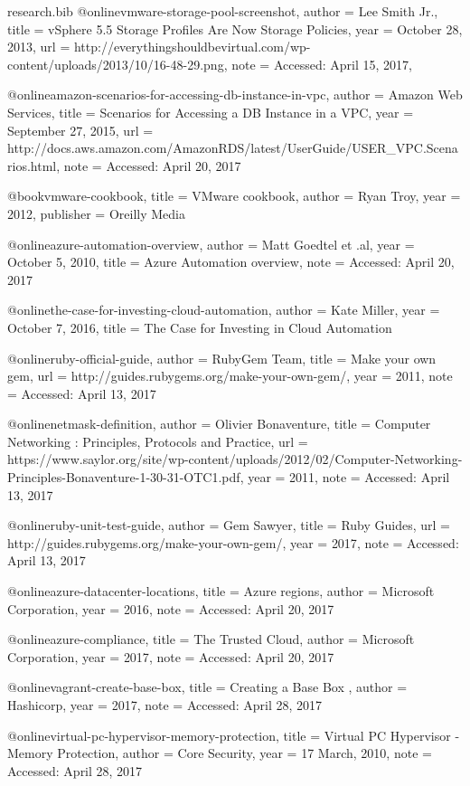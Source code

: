 \documentclass{article}
\begin{document}
\begin{filecontents*}{research.bib}
	@online{vmware-storage-pool-screenshot,
		author  = {Lee Smith Jr.},
		title   = {vSphere 5.5 Storage Profiles Are Now Storage Policies},
		year    = {October 28, 2013},
		url     = {http://everythingshouldbevirtual.com/wp-content/uploads/2013/10/16-48-29.png},
		note = {Accessed: April 15, 2017},
	}

	@online{amazon-scenarios-for-accessing-db-instance-in-vpc,
		author = {Amazon Web Services},
		title = {Scenarios for Accessing a DB Instance in a VPC},
		year = {September 27, 2015},
		url = {http://docs.aws.amazon.com/AmazonRDS/latest/UserGuide/USER_VPC.Scenarios.html},
		note = {Accessed: April 20, 2017}
	}

	@book{vmware-cookbook,
		title = {VMware cookbook},
		author = {Ryan Troy},
		year = {2012},
		publisher = {Oreilly Media}
	}

	@online{azure-automation-overview,
		author = {Matt Goedtel et .al},
		year = {October 5, 2010},
		title = {Azure Automation overview},
		note = {Accessed: April 20, 2017}
	}

	@online{the-case-for-investing-cloud-automation,
		author = {Kate Miller},
		year = {October 7, 2016},
		title = {The Case for Investing in Cloud Automation}
	}

    @online{ruby-official-guide,
		author = {RubyGem Team},
		title = {Make your own gem},
		url = {http://guides.rubygems.org/make-your-own-gem/},
		year = {2011},
		note = {Accessed: April 13, 2017}
	}

	@online{netmask-definition,
		author = {Olivier Bonaventure},
		title = {Computer Networking : Principles, Protocols and Practice},
		url = {https://www.saylor.org/site/wp-content/uploads/2012/02/Computer-Networking-Principles-Bonaventure-1-30-31-OTC1.pdf},
		year = {2011},
		note = {Accessed: April 13, 2017}
	}

	@online{ruby-unit-test-guide,
		author = {Gem Sawyer},
		title = {Ruby Guides},
		url = {http://guides.rubygems.org/make-your-own-gem/},
		year = {2017},
		note = {Accessed: April 13, 2017}
	}

	@online{azure-datacenter-locations,
		title = {Azure regions},
		author = {Microsoft Corporation},
		year = {2016},
		note = {Accessed: April 20, 2017}
	}

	@online{azure-compliance,
		title = {The Trusted Cloud},
		author = {Microsoft Corporation},
		year = {2017},
		note = {Accessed: April 20, 2017}
	}

	@online{vagrant-create-base-box,
		title = {Creating a Base Box },
		author = {Hashicorp},
		year = {2017},
		note = {Accessed: April 28, 2017}
	}

	@online{virtual-pc-hypervisor-memory-protection,
		title = {Virtual PC Hypervisor - Memory Protection},
		author = {Core Security},
		year = {17 March, 2010},
		note = {Accessed: April 28, 2017}
	}

\end{filecontents*}


\end{document}
